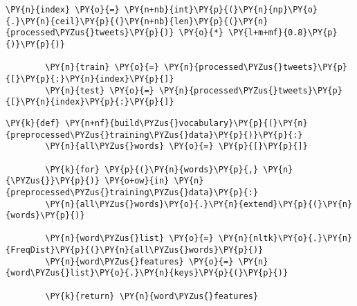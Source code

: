 \begin{tcolorbox}[breakable, size=fbox, boxrule=1pt, pad at break*=1mm,colback=cellbackground, colframe=cellborder]
    \begin{Verbatim}[commandchars=\\\{\}]
        \PY{n}{index} \PY{o}{=} \PY{n+nb}{int}\PY{p}{(}\PY{n}{np}\PY{o}{.}\PY{n}{ceil}\PY{p}{(}\PY{n+nb}{len}\PY{p}{(}\PY{n}{processed\PYZus{}tweets}\PY{p}{)} \PY{o}{*} \PY{l+m+mf}{0.8}\PY{p}{)}\PY{p}{)}

        \PY{n}{train} \PY{o}{=} \PY{n}{processed\PYZus{}tweets}\PY{p}{[}\PY{p}{:}\PY{n}{index}\PY{p}{]}
        \PY{n}{test} \PY{o}{=} \PY{n}{processed\PYZus{}tweets}\PY{p}{[}\PY{n}{index}\PY{p}{:}\PY{p}{]}
    \end{Verbatim}
\end{tcolorbox}

\begin{tcolorbox}[breakable, size=fbox, boxrule=1pt, pad at break*=1mm,colback=cellbackground, colframe=cellborder]
    \begin{Verbatim}[commandchars=\\\{\}]
        \PY{k}{def} \PY{n+nf}{build\PYZus{}vocabulary}\PY{p}{(}\PY{n}{preprocessed\PYZus{}training\PYZus{}data}\PY{p}{)}\PY{p}{:}
        \PY{n}{all\PYZus{}words} \PY{o}{=} \PY{p}{[}\PY{p}{]}

        \PY{k}{for} \PY{p}{(}\PY{n}{words}\PY{p}{,} \PY{n}{\PYZus{}}\PY{p}{)} \PY{o+ow}{in} \PY{n}{preprocessed\PYZus{}training\PYZus{}data}\PY{p}{:}
        \PY{n}{all\PYZus{}words}\PY{o}{.}\PY{n}{extend}\PY{p}{(}\PY{n}{words}\PY{p}{)}

        \PY{n}{word\PYZus{}list} \PY{o}{=} \PY{n}{nltk}\PY{o}{.}\PY{n}{FreqDist}\PY{p}{(}\PY{n}{all\PYZus{}words}\PY{p}{)}
        \PY{n}{word\PYZus{}features} \PY{o}{=} \PY{n}{word\PYZus{}list}\PY{o}{.}\PY{n}{keys}\PY{p}{(}\PY{p}{)}

        \PY{k}{return} \PY{n}{word\PYZus{}features}
    \end{Verbatim}
\end{tcolorbox}

